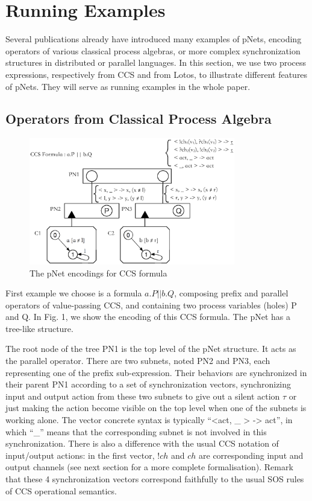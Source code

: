 \documentclass{lncs/llncs}
\begin{document}
\section{Running Examples}
\label{section:examples}

Several publications \cite{HMZ:PDP15,henrio:Forte2016} already have introduced
many examples of pNets, encoding
operators of various classical process algebras, or more complex
synchronization structures in distributed or parallel languages.
In this section, we use two process expressions, respectively from CCS
and from Lotos, to illustrate different features of pNets. They will
serve as running examples in the whole paper.  


\subsection{Operators from Classical Process Algebra}

\begin{figure}[h]
  \centerline{\includegraphics[width=9cm]{XFIG/CCS1}}
  \caption{The pNet encodings for CCS formula}  \label{schema:ccs-pnets}
\end{figure}

First example we choose is a formula $a.P||b.Q$, composing prefix and
parallel operators of value-passing CCS, and containing two process
variables (holes) P and Q. In Fig. 1, we show the encoding of this CCS
formula. The pNet has a tree-like structure.  

The root node of the tree PN1 is the top level of the pNet
  structure. It acts as the parallel operator. There are two subnets,
  noted PN2 and PN3, each representing one of the prefix
  sub-expression. Their behaviors are synchronized in their parent PN1
  according to a set of synchronization vectors, synchronizing input
  and output action from these two subnets to give out a silent action
  $\tau$ or just making the action become visible on the top level when
  one of the subnets is working alone. The vector concrete syntax is typically
  ``<act, \_ > -> act'', in which ``\_'' means that the corresponding
  subnet is not involved in this synchronization.
  There is also a difference with the usual CCS notation of
  input/output actions: in the first vector, $!ch$ and $ch$ are
  corresponding input and output channels (see next section for a more
  complete formalisation). 
  Remark that these 4
  synchronization vectors correspond faithfully to the usual SOS
  rules of CCS operational semantics.
\end{document}
